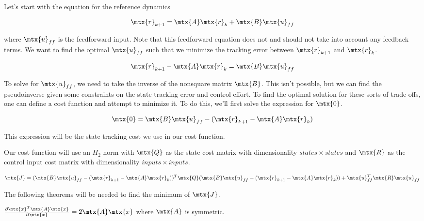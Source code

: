 Let's start with the equation for the \gls{reference} dynamics

\begin{equation*}
  \mtx{r}_{k+1} = \mtx{A}\mtx{r}_k + \mtx{B}\mtx{u}_{ff}
\end{equation*}

where $\mtx{u}_{ff}$ is the feedforward input. Note that this feedforward
equation does not and should not take into account any feedback terms. We want
to find the optimal $\mtx{u}_{ff}$ such that we minimize the \gls{tracking}
error between $\mtx{r}_{k+1}$ and $\mtx{r}_k$.

\begin{equation*}
  \mtx{r}_{k+1} - \mtx{A}\mtx{r}_k = \mtx{B}\mtx{u}_{ff}
\end{equation*}

To solve for $\mtx{u}_{ff}$, we need to take the inverse of the nonsquare matrix
$\mtx{B}$. This isn't possible, but we can find the pseudoinverse given some
constraints on the \gls{state} \gls{tracking} error and \gls{control effort}. To
find the optimal solution for these sorts of trade-offs, one can define a cost
function and attempt to minimize it. To do this, we'll first solve the
expression for $\mtx{0}$.

\begin{equation*}
  \mtx{0} = \mtx{B}\mtx{u}_{ff} - (\mtx{r}_{k+1} - \mtx{A}\mtx{r}_k)
\end{equation*}

This expression will be the \gls{state} \gls{tracking} cost we use in our cost
function.

Our cost function will use an $H_2$ norm with $\mtx{Q}$ as the \gls{state} cost
matrix with dimensionality $states \times states$ and $\mtx{R}$ as the
\gls{control input} cost matrix with dimensionality $inputs \times inputs$.

\begin{equation*}
  \mtx{J} = (\mtx{B}\mtx{u}_{ff} - (\mtx{r}_{k+1} - \mtx{A}\mtx{r}_k))^T \mtx{Q}
    (\mtx{B}\mtx{u}_{ff} - (\mtx{r}_{k+1} - \mtx{A}\mtx{r}_k)) +
    \mtx{u}_{ff}^T\mtx{R}\mtx{u}_{ff}
\end{equation*}

The following theorems will be needed to find the minimum of $\mtx{J}$.

\begin{theorem}
  \label{thm:partial_xax}

  $\frac{\partial \mtx{x}^T\mtx{A}\mtx{x}}{\partial\mtx{x}} =
    2\mtx{A}\mtx{x}$ where $\mtx{A}$ is symmetric.
\end{theorem}

